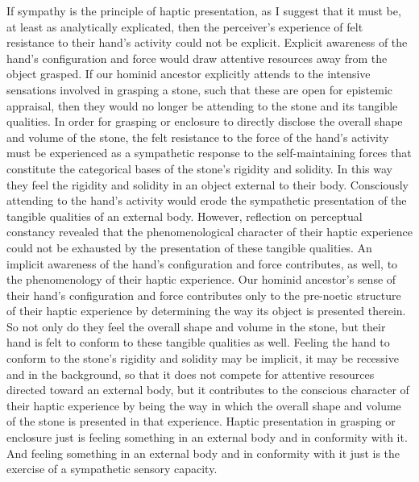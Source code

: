 \documentclass[12pt]{article}
\begin{document}
If sympathy is the principle of haptic presentation, as I suggest that it must be, at least as analytically explicated, then the perceiver's experience of felt resistance to their hand's activity could not be explicit. Explicit awareness of the hand's configuration and force would draw attentive resources away from the object grasped. If our hominid ancestor explicitly attends to the intensive sensations involved in grasping a stone, such that these are open for epistemic appraisal, then they would no longer be attending to the stone and its tangible qualities. In order for grasping or enclosure to directly disclose the overall shape and volume of the stone, the felt resistance to the force of the hand's activity must be experienced as a sympathetic response to the self-maintaining forces that constitute the categorical bases of the stone's rigidity and solidity. In this way they feel the rigidity and solidity in an object external to their body. Consciously attending to the hand's activity would erode the sympathetic presentation of the tangible qualities of an external body. However, reflection on perceptual constancy revealed that the phenomenological character of their haptic experience could not be exhausted by the presentation of these tangible qualities. An implicit awareness of the hand's configuration and force contributes, as well, to the phenomenology of their haptic experience. Our hominid ancestor's sense of their hand’s configuration and force contributes only to the pre-noetic structure of their haptic experience by determining the way its object is presented therein. So not only do they feel the overall shape and volume in the stone, but their hand is felt to conform to these tangible qualities as well. Feeling the hand to conform to the stone's rigidity and solidity may be implicit, it may be recessive and in the background, so that it does not compete for attentive resources directed toward an external body, but it contributes to the conscious character of their haptic experience by being the way in which the overall shape and volume of the stone is presented in that experience. Haptic presentation in grasping or enclosure just is feeling something in an external body and in conformity with it. And feeling something in an external body and in conformity with it just is the exercise of a sympathetic sensory capacity.
\end{document}
